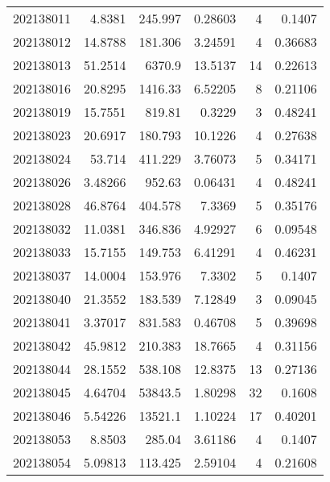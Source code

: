 \begin{tabular}{rrrrrr}
 202138011 &          4.8381  &      245.997  &            0.28603 &           4 & 0.1407  \\
 202138012 &         14.8788  &      181.306  &            3.24591 &           4 & 0.36683 \\
 202138013 &         51.2514  &     6370.9    &           13.5137  &          14 & 0.22613 \\
 202138016 &         20.8295  &     1416.33   &            6.52205 &           8 & 0.21106 \\
 202138019 &         15.7551  &      819.81   &            0.3229  &           3 & 0.48241 \\
 202138023 &         20.6917  &      180.793  &           10.1226  &           4 & 0.27638 \\
 202138024 &         53.714   &      411.229  &            3.76073 &           5 & 0.34171 \\
 202138026 &          3.48266 &      952.63   &            0.06431 &           4 & 0.48241 \\
 202138028 &         46.8764  &      404.578  &            7.3369  &           5 & 0.35176 \\
 202138032 &         11.0381  &      346.836  &            4.92927 &           6 & 0.09548 \\
 202138033 &         15.7155  &      149.753  &            6.41291 &           4 & 0.46231 \\
 202138037 &         14.0004  &      153.976  &            7.3302  &           5 & 0.1407  \\
 202138040 &         21.3552  &      183.539  &            7.12849 &           3 & 0.09045 \\
 202138041 &          3.37017 &      831.583  &            0.46708 &           5 & 0.39698 \\
 202138042 &         45.9812  &      210.383  &           18.7665  &           4 & 0.31156 \\
 202138044 &         28.1552  &      538.108  &           12.8375  &          13 & 0.27136 \\
 202138045 &          4.64704 &    53843.5    &            1.80298 &          32 & 0.1608  \\
 202138046 &          5.54226 &    13521.1    &            1.10224 &          17 & 0.40201 \\
 202138053 &          8.8503  &      285.04   &            3.61186 &           4 & 0.1407  \\
 202138054 &          5.09813 &      113.425  &            2.59104 &           4 & 0.21608 \\

\end{tabular}
